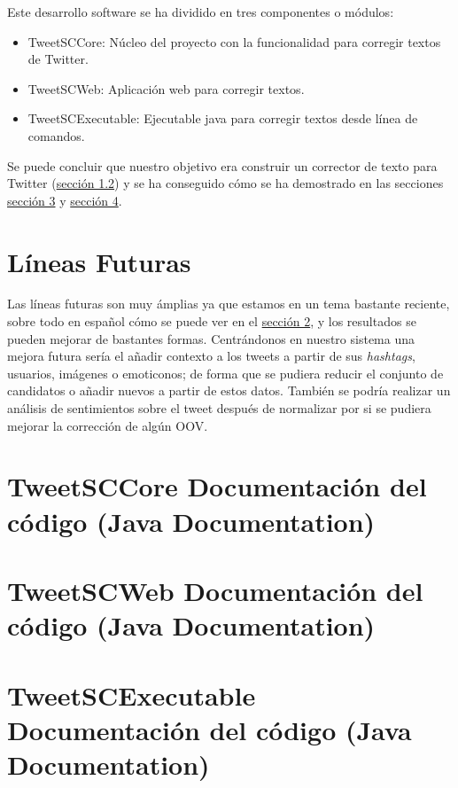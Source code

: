 \documentclass[spanish,12pt, a4paper,twoside]{paper}
\let\oldsection\section
\def\section{\cleardoublepage\oldsection}
\begin{document}
Este desarrollo software se ha dividido en tres componentes o módulos:
\begin{itemize}
	\item TweetSCCore: Núcleo del proyecto con la funcionalidad para corregir textos de Twitter.
	\item TweetSCWeb: Aplicación web para corregir textos.
	\item TweetSCExecutable: Ejecutable java para corregir textos desde línea de comandos.
\end{itemize}
Se puede concluir que nuestro objetivo era construir un corrector de texto para Twitter (\hyperref[sec:objetivos]{sección 1.2}) y se ha conseguido cómo se ha demostrado en las secciones \hyperref[sec:solucionpropuesta]{sección 3} y \hyperref[sec:implementacion]{sección 4}.

\section{Líneas Futuras}\label{sec:lineasfuturas}
Las líneas futuras son muy ámplias ya que estamos en un tema bastante reciente, sobre todo en español cómo se puede ver en el \hyperref[sec:estadodelarte]{sección 2}, y los resultados se pueden mejorar de bastantes formas. Centrándonos en nuestro sistema una mejora futura sería el añadir contexto a los tweets a partir de sus \textit{hashtags}, usuarios, imágenes o emoticonos; de forma que se pudiera reducir el conjunto de candidatos o añadir nuevos a partir de estos datos. También se podría realizar un análisis de sentimientos sobre el tweet después de normalizar por si se pudiera mejorar la corrección de algún OOV.

\section{TweetSCCore Documentación del código (Java Documentation)}\label{sec:tweetsccorejavadoc}


\section{TweetSCWeb Documentación del código (Java Documentation)}\label{sec:tweetscwebjavadoc}


\section{TweetSCExecutable Documentación del código (Java Documentation)}\label{sec:tweetscexecutablejavadoc}

\end{document}
